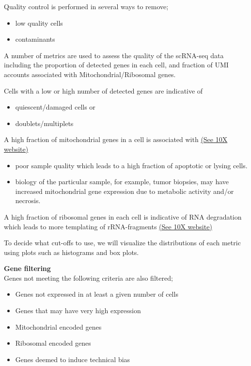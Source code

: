 \documentclass[
  openany]{book}
\providecommand{\tightlist}{%
  \setlength{\itemsep}{0pt}\setlength{\parskip}{0pt}}
\begin{document}
Quality control is performed in several ways to remove;

\begin{itemize}
\tightlist
\item
  low quality cells
\item
  contaminants
\end{itemize}

A number of metrics are used to assess the quality of the scRNA-seq data including the proportion of detected genes in each cell, and fraction of UMI accounts associated with Mitochondrial/Ribosomal genes.

Cells with a low or high number of detected genes are indicative of

\begin{itemize}
\tightlist
\item
  quiescent/damaged cells or
\item
  doublets/multiplets \citep{nayak2021hitchhiker}
\end{itemize}

A high fraction of mitochondrial genes in a cell is associated with \href{https://kb.10xgenomics.com/hc/en-us/articles/360001086611-Why-do-I-see-a-high-level-of-mitochondrial-gene-expression-}{(See 10X website)}

\begin{itemize}
\tightlist
\item
  poor sample quality which leads to a high fraction of apoptotic or lysing cells.
\item
  biology of the particular sample, for example, tumor biopsies, may have increased mitochondrial gene expression due to metabolic activity and/or necrosis.
\end{itemize}

A high fraction of ribosomal genes in each cell is indicative of RNA degradation which leads to more templating of rRNA-fragments \href{https://kb.10xgenomics.com/hc/en-us/articles/218169723-What-fraction-of-reads-map-to-ribosomal-proteins-}{(See 10X website)}

To decide what cut-offs to use, we will visualize the distributions of each metric using plots such as histograms and box plots.

\textbf{Gene filtering}\\

Genes not meeting the following criteria are also filtered;

\begin{itemize}
\tightlist
\item
  Genes not expressed in at least a given number of cells
\item
  Genes that may have very high expression
\item
  Mitochondrial encoded genes
\item
  Ribosomal encoded genes
\item
  Genes deemed to induce technical bias
\end{itemize}
\end{document}
